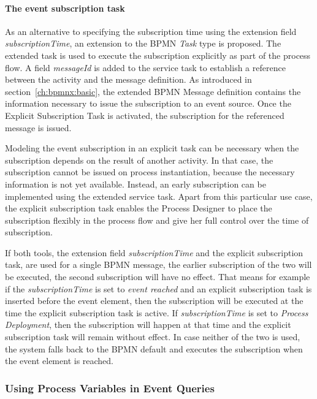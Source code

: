 \paragraph{The event subscription task\newline}
As an alternative to specifying the subscription time using the extension field \textit{subscriptionTime}, an extension to the BPMN \textit{Task} type is proposed. 
The extended task is used to execute the subscription explicitly as part of the process flow.
A field \textit{messageId} is added to the service task to establish a reference between the activity and the message definition.
As introduced in section~\autoref{ch:bpmnx:basic}, the extended BPMN Message definition contains the information necessary to issue the subscription to an event source.
Once the Explicit Subscription Task is activated, the subscription for the referenced message is issued. 

Modeling the event subscription in an explicit task can be necessary when the subscription depends on the result of another activity. In that case, the subscription cannot be issued on process instantiation, because the necessary information is not yet available. Instead, an early subscription can be implemented using the extended service task.
Apart from this particular use case, the explicit subscription task enables the Process Designer to place the subscription flexibly in the process flow and give her full control over the time of subscription.

If both tools, the extension field \textit{subscriptionTime} and the explicit subscription task, are used for a single BPMN message, the earlier subscription of the two will be executed, the second subscription will have no effect.
That means for example if the \textit{subscriptionTime} is set to \textit{event reached} and an explicit subscription task is inserted before the event element, then the subscription will be executed at the time the explicit subscription task is active.
If \textit{subscriptionTime} is set to \textit{Process Deployment}, then the subscription will happen at that time and the explicit subscription task will remain without effect.
In case neither of the two is used, the system falls back to the BPMN default and executes the subscription when the event element is reached.

\subsubsection{Using Process Variables in Event Queries}\label{ch:bpmnx:variables-in-queries}

